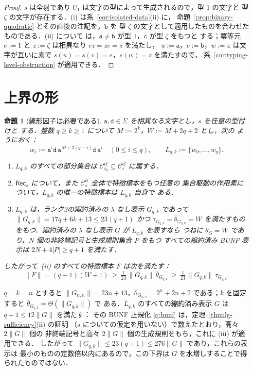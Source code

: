 \documentclass[11pt,a4paper]{ltjsarticle}
\numberwithin{equation}{section}
\theoremstyle{plain}
\newtheorem{proposition}[theorem]{命題}
\theoremstyle{definition}
\theoremstyle{remark}
\theoremstyle{plain}
\newcommand{\cf}{\mathrm{cf}}
\newcommand{\Ccf}[1]{\mathcal C_{#1}^{\cf}}
\newcommand{\Rec}{\mathsf{Rec}}
\begin{document}
\begin{proof}
$s$ は全射であり $U_1$ は文字の型によって生成されるので，型 $1$ の文字と
型 $\zeta$ の文字が存在する．(i) は系~\ref{cor:isolated-data}(ii) に，
命題~\ref{prop:binary-quadratic} とその直後の注記を，$\mathtt b$ を
型 $\zeta$ の文字として適用したものを合わせたものである．(ii) について
は，$\mathtt a\ne\mathtt b$ が型 $1$，$\mathtt c$ が型 $\zeta$ をもつと
する；冪等元 $e:=1$ と $z:=\zeta$ は相異なり $ez=ze=z$ を満たし，
$u:=\mathtt a$，$v:=\mathtt b$，$w:=\mathtt c$ は文字が互いに素で
$s(u)=s(v)=e$，$s(w)=z$ を満たすので，
系~\ref{cor:typing-level-obstruction} が適用できる．
\end{proof}

\section{上界の形}
\label{sec:shape}

\begin{proposition}[線形因子は必要である]
\label{prop:linear-factor}
$\mathtt a,\mathtt d\in\Sigma$ を相異なる文字とし，$s$ を任意の型付けと
する．整数 $q\ge k\ge1$ について $M:=2^k$，$W:=M+2q+2$ とし，次の
ようにおく：
\[
 w_i:=\mathtt a^i\mathtt d\,\mathtt a^{M+2(q-i)}\mathtt d\,
 \mathtt a^i\quad(0\le i\le q),\qquad L_{q,k}:=\{w_0,\ldots,w_q\}.
\]
\begin{enumerate}[label=\textup{(\roman*)},leftmargin=*]
\item $L_{q,k}$ のすべての部分集合は
$\Ccf{s_0}\subseteq\Ccf{s}$ に属する．
\item $\Rec_s$ について，また $\Ccf{s}$ 全体で特徴標本をもつ任意の
集合駆動の作用素について，$L_{q,k}$ の唯一の特徴標本は $L_{q,k}$ 自身で
ある．
\item $L_{q,k}$ は，ランク2の縮約済みの $\lambda$ なし表示 $G_{q,k}$ であって
$\|G_{q,k}\|=17q+6k+13\le23(q+1)$ かつ $\tau_{G_{q,k}}=\bar\theta_{G_{q,k}}=W$
を満たすものをもつ．縮約済みの $\lambda$ なし表示 $G$ が $L_{q,k}$ を表すなら
つねに $\bar\theta_G=W$ であり，$N$ 個の非終端記号と生成規則集合 $P$ をもつ
すべての縮約済み BUNF 表示は $2N+4|P|\ge q+1$ を満たす．
\end{enumerate}
したがって~\textup{(ii)} のすべての特徴標本 $F$ は次を満たす：
\[
 \|F\|=(q+1)(W+1)\ \ge\ \tfrac1{23}\,\|G_{q,k}\|\,\bar\theta_{G_{q,k}}
 \ \ge\ \tfrac1{23}\,\|G_{q,k}\|\,\tau_{G_{q,k}}.
\]
\end{proposition}

$q=k=n$ とすると $\|G_{n,n}\|=23n+13$，$\bar\theta_{G_{n,n}}=2^n+2n+2$
である；$k$ を固定すると $\bar\theta_{G_{q,k}}=\Theta(\|G_{q,k}\|)$ で
ある．$L_{q,k}$ のすべての縮約済み表示 $G$ は $q+1\le12\|G\|$ を満たす：
その BUNF 正規化 \ref{q:bunf} は，定理~\ref{thm:lg-sufficiency}(ii) の証明
（$s$ についての仮定を用いない）で数えたとおり，高々 $2\|G\|$ 個の
非終端記号と高々 $2\|G\|$ 個の生成規則をもち，これに (iii) が適用できる．
したがって $\|G_{q,k}\|\le23(q+1)\le276\|G\|$ であり，これらの表示は
最小のものの定数倍以内にあるので，この下界は $G$ を水増しすることで得られたものではない．
\end{document}
